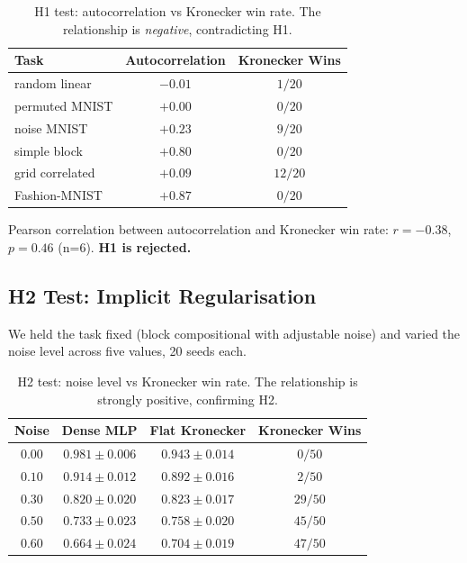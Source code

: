 \documentclass[11pt,a4paper]{article}
\begin{document}
\begin{table}[h]
\centering
\caption{H1 test: autocorrelation vs Kronecker win rate. The
relationship is \emph{negative}, contradicting H1.}
\label{tab:h1}
\small
\begin{tabular}{lcc}
\toprule
Task & Autocorrelation & Kronecker Wins \\
\midrule
random linear     & $-0.01$ & $1/20$ \\
permuted MNIST    & $+0.00$ & $0/20$ \\
noise MNIST       & $+0.23$ & $9/20$ \\
simple block      & $+0.80$ & $0/20$ \\
grid correlated   & $+0.09$ & $12/20$ \\
Fashion-MNIST     & $+0.87$ & $0/20$ \\
\bottomrule
\end{tabular}
\end{table}

Pearson correlation between autocorrelation and Kronecker win rate:
$r = -0.38$, $p = 0.46$ (n=6). \textbf{H1 is rejected.}


\subsection{H2 Test: Implicit Regularisation}
\label{sec:h2}

We held the task fixed (block compositional with adjustable noise)
and varied the noise level across five values, 20 seeds each.

\begin{table}[h]
\centering
\caption{H2 test: noise level vs Kronecker win rate. The
relationship is strongly positive, confirming H2.}
\label{tab:h2}
\small
\begin{tabular}{cccc}
\toprule
Noise & Dense MLP & Flat Kronecker & Kronecker Wins \\
\midrule
$0.00$ & $0.981 \pm 0.006$ & $0.943 \pm 0.014$ & $0/50$ \\
$0.10$ & $0.914 \pm 0.012$ & $0.892 \pm 0.016$ & $2/50$ \\
$0.30$ & $0.820 \pm 0.020$ & $0.823 \pm 0.017$ & $29/50$ \\
$0.50$ & $0.733 \pm 0.023$ & $0.758 \pm 0.020$ & $45/50$ \\
$0.60$ & $0.664 \pm 0.024$ & $0.704 \pm 0.019$ & $47/50$ \\
\bottomrule
\end{tabular}
\end{table}
\end{document}
